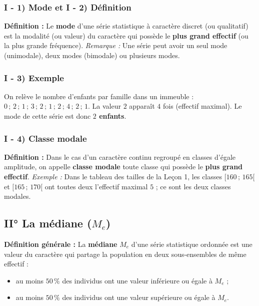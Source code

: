 \documentclass[11pt, a4paper]{article}
\begin{document}
\subsubsection*{I - 1) Mode et I - 2) Définition}
\textbf{Définition :} Le \textbf{mode} d'une série statistique à caractère discret (ou qualitatif) est la modalité (ou valeur) du caractère qui possède le \textbf{plus grand effectif} (ou la plus grande fréquence).
\textit{Remarque :} Une série peut avoir un seul mode (unimodale), deux modes (bimodale) ou plusieurs modes.

\subsubsection*{I - 3) Exemple}
On relève le nombre d'enfants par famille dans un immeuble : $0\,;\, 2\,;\, 1\,;\, 3\,;\, 2\,;\, 1\,;\, 2\,;\, 4\,;\, 2\,;\, 1$.
La valeur $2$ apparaît $4$ fois (effectif maximal). Le mode de cette série est donc \textbf{$2$ enfants}.

\subsubsection*{I - 4) Classe modale}
\textbf{Définition :} Dans le cas d'un caractère continu regroupé en classes d'égale amplitude, on appelle \textbf{classe modale} toute classe qui possède le \textbf{plus grand effectif}.
\textit{Exemple :} Dans le tableau des tailles de la Leçon 1, les classes $[160\,;\,165[$ et $[165\,;\,170[$ ont toutes deux l'effectif maximal $5$ ; ce sont les deux classes modales.

\subsection*{\textcolor{primary}{II° La médiane ($M_e$)}}

\textbf{Définition générale :} La \textbf{médiane} $M_e$ d'une série statistique ordonnée est une valeur du caractère qui partage la population en deux sous-ensembles de même effectif :
\begin{itemize}
    \item au moins $50\,\%$ des individus ont une valeur inférieure ou égale à $M_e$ ;
    \item au moins $50\,\%$ des individus ont une valeur supérieure ou égale à $M_e$.
\end{itemize}
\end{document}
